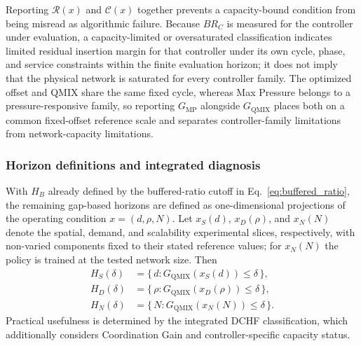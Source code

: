 \documentclass[review,12pt]{elsarticle}
\begin{document}
Reporting $\mathcal{R}(x)$ and $\mathcal{C}(x)$ together prevents a capacity-bound condition from being misread as algorithmic failure. Because $BR_C$ is measured for the controller under evaluation, a capacity-limited or oversaturated classification indicates limited residual insertion margin for that controller under its own cycle, phase, and service constraints within the finite evaluation horizon; it does not imply that the physical network is saturated for every controller family. The optimized offset and QMIX share the same fixed cycle, whereas Max Pressure belongs to a pressure-responsive family, so reporting $G_{\mathrm{MP}}$ alongside $G_{\mathrm{QMIX}}$ places both on a common fixed-offset reference scale and separates controller-family limitations from network-capacity limitations.
\subsubsection{Horizon definitions and integrated diagnosis}
\label{subsubsec:horizon_definitions}

With $H_B$ already defined by the buffered-ratio cutoff in
Eq.~\eqref{eq:buffered_ratio}, the remaining gap-based horizons are defined as
one-dimensional projections of the operating condition
$x=(d,\rho,N)$. Let $x_S(d)$, $x_D(\rho)$, and $x_N(N)$ denote the spatial,
demand, and scalability experimental slices, respectively, with non-varied
components fixed to their stated reference values; for $x_N(N)$ the policy is
trained at the tested network size. Then
\begin{equation}
\begin{aligned}
H_S(\delta)&=\{\,d:G_{\mathrm{QMIX}}(x_S(d))\leq\delta\,\},\\
H_D(\delta)&=\{\,\rho:G_{\mathrm{QMIX}}(x_D(\rho))\leq\delta\,\},\\
H_N(\delta)&=\{\,N:G_{\mathrm{QMIX}}(x_N(N))\leq\delta\,\}.
\end{aligned}
\label{eq:horizon_defs}
\end{equation}
Practical usefulness is determined by the integrated DCHF classification, which additionally considers Coordination Gain and controller-specific capacity status.
\end{document}
